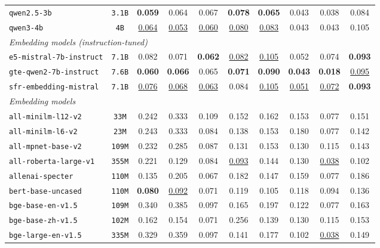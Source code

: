 \documentclass{article}
\begin{document}
\begin{table}[htbp]
{\begin{tabular}{lccccccccc}
\texttt{qwen2.5-3b} & \texttt{3.1B} & \textbf{0.059} & 0.064 & 0.067 & \textbf{0.078} & \textbf{0.065} & 0.043 & 0.038 & 0.084 \\
\texttt{qwen3-4b} & \texttt{4B} & \underline{0.064} & \underline{0.053} & \underline{0.060} & \underline{0.080} & \underline{0.083} & 0.043 & 0.043 & 0.105 \\
\midrule
\multicolumn{10}{l}{\textit{Embedding models (instruction-tuned)}} \\
\midrule
\texttt{e5-mistral-7b-instruct} & \texttt{7.1B} & 0.082 & 0.071 & \textbf{0.062} & \underline{0.082} & \underline{0.105} & 0.052 & 0.074 & \textbf{0.093} \\
\texttt{gte-qwen2-7b-instruct} & \texttt{7.6B} & \textbf{0.060} & \textbf{0.066} & 0.065 & \textbf{0.071} & \textbf{0.090} & \textbf{0.043} & \textbf{0.018} & \underline{0.095} \\
\texttt{sfr-embedding-mistral} & \texttt{7.1B} & \underline{0.076} & \underline{0.068} & \underline{0.063} & 0.084 & \underline{0.105} & \underline{0.051} & \underline{0.072} & \textbf{0.093} \\
\midrule
\multicolumn{10}{l}{\textit{Embedding models}} \\
\midrule
\texttt{all-minilm-l12-v2} & \texttt{33M} & 0.242 & 0.333 & 0.109 & 0.152 & 0.162 & 0.153 & 0.077 & 0.151 \\
\texttt{all-minilm-l6-v2} & \texttt{23M} & 0.243 & 0.333 & 0.084 & 0.138 & 0.153 & 0.180 & 0.077 & 0.142 \\
\texttt{all-mpnet-base-v2} & \texttt{109M} & 0.232 & 0.285 & 0.087 & 0.131 & 0.153 & 0.130 & 0.115 & 0.143 \\
\texttt{all-roberta-large-v1} & \texttt{355M} & 0.221 & 0.129 & 0.084 & \underline{0.093} & 0.144 & 0.130 & \underline{0.038} & 0.102 \\
\texttt{allenai-specter} & \texttt{110M} & 0.135 & 0.205 & 0.067 & 0.182 & 0.147 & 0.159 & 0.077 & 0.186 \\
\texttt{bert-base-uncased} & \texttt{110M} & \textbf{0.080} & \underline{0.092} & 0.071 & 0.119 & 0.105 & 0.118 & 0.094 & 0.136 \\
\texttt{bge-base-en-v1.5} & \texttt{109M} & 0.340 & 0.385 & 0.097 & 0.165 & 0.197 & 0.122 & 0.077 & 0.163 \\
\texttt{bge-base-zh-v1.5} & \texttt{102M} & 0.162 & 0.154 & 0.071 & 0.256 & 0.139 & 0.130 & 0.115 & 0.153 \\
\texttt{bge-large-en-v1.5} & \texttt{335M} & 0.329 & 0.359 & 0.097 & 0.141 & 0.177 & 0.102 & \underline{0.038} & 0.149 \\

\end{tabular}}
\end{table}
\end{document}
